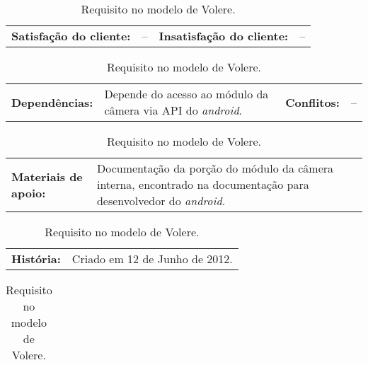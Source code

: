 \begin{table}[h]
    \vspace{5pt}
    \begin{tabularx}{\textwidth}{p{}p{}
                                 p{}p{}}
        \textbf{Satisfação do cliente:} & -- & 
        \textbf{Insatisfação do cliente:} & --
    \end{tabularx}
    
    \vspace{5pt}
    \begin{tabularx}{\textwidth}{p{}p{}
                                 p{}p{}}
        \textbf{Dependências:} & Depende do acesso ao módulo da 
            câmera via API do \emph{android}.
        & \textbf{Conflitos:} & -- \\
    \end{tabularx}
    
    \vspace{5pt}
    \begin{tabularx}{\textwidth}{p{} p{}}
        \textbf{Materiais de apoio:} &
        Documentação da porção do módulo da câmera interna, encontrado
        na documentação para desenvolvedor do \emph{android}.
    \end{tabularx}
    
    \vspace{5pt}
    \begin{tabularx}{\textwidth}{p{} p{}}
        \textbf{História:} &
        Criado em 12 de Junho de 2012. \\
    \end{tabularx}
    
    \begin{tabularx}{\textwidth}{c}
        \bottomrule
    \end{tabularx}
    
    \caption{ \label{Volere1} Requisito no modelo de Volere. }
\end{table}

